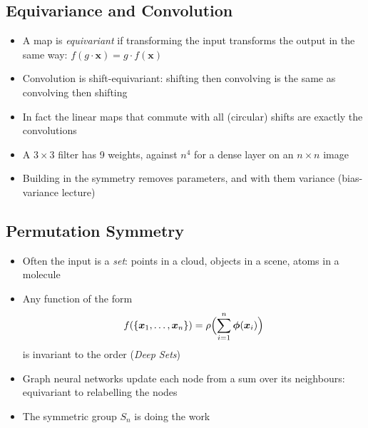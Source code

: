 \begin{slide}
\section[-1]{Equivariance and Convolution}

\begin{PauseHighLight}
  \begin{itemize}
  \item A map is \emph{equivariant} if transforming the input transforms
    the output in the same way: $f(g\cdot\bm{x}) = g\cdot f(\bm{x})$\pause
  \item Convolution is shift-equivariant: shifting then convolving is
    the same as convolving then shifting\pause
  \item In fact the linear maps that commute with all (circular) shifts
    are exactly the convolutions\pause
  \item A $3\times3$ filter has 9 weights, against $n^4$ for a dense
    layer on an $n\times n$ image\pause
  \item Building in the symmetry removes parameters, and with them
    variance (bias-variance lecture)\pause
  \end{itemize}
\end{PauseHighLight}

\end{slide}

\begin{slide}
\section[-1]{Permutation Symmetry}

\begin{PauseHighLight}
  \begin{itemize}
  \item Often the input is a \emph{set}: points in a cloud, objects in a
    scene, atoms in a molecule\pause
  \item Any function of the form
    \begin{align*}
      f(\{\bm{x}_1,\ldots,\bm{x}_n\}) = \rho\Bigl(\sum_{i=1}^n
      \bm{\phi}(\bm{x}_i)\Bigr)
    \end{align*}
    is invariant to the order (\emph{Deep Sets})\pause
  \item Graph neural networks update each node from a sum over its
    neighbours: equivariant to relabelling the nodes\pause
  \item The symmetric group $S_n$ is doing the work\pause
  \end{itemize}
\end{PauseHighLight}

\end{slide}

